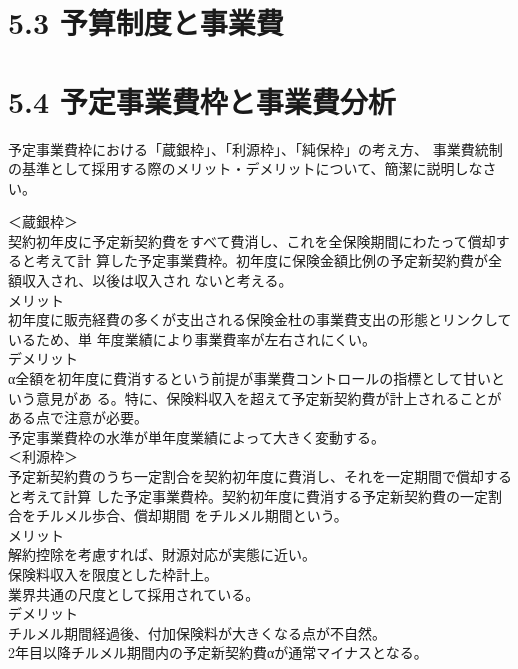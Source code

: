 \documentclass[report,gutter=10mm,fore-edge=10mm,uplatex,dvipdfmx]{jlreq}
\begin{document}
\section{5.3 予算制度と事業費}
\section{5.4 予定事業費枠と事業費分析}
\vspace{1zh}
予定事業費枠における「蔵銀枠」、「利源枠」、「純保枠」の考え方、
事業費統制の基準として採用する際のメリット・デメリットについて、簡潔に説明しなさい。

\answer{}
\noindent ＜蔵銀枠＞\\
契約初年皮に予定新契約費をすべて費消し、これを全保険期間にわたって償却すると考えて計
算した予定事業費枠。初年度に保険金額比例の予定新契約費が全額収入され、以後は収入され
ないと考える。\\
メリット \\
初年度に販売経費の多くが支出される保険金杜の事業費支出の形態とリンクしているため、単
年度業績により事業費率が左右されにくい。\\
デメリット\\
α全額を初年度に費消するという前提が事業費コントロールの指標として甘いという意見があ
る。特に、保険料収入を超えて予定新契約費が計上されることがある点で注意が必要。\\
予定事業費枠の水準が単年度業績によって大きく変動する。\\

\noindent＜利源枠＞\\
予定新契約費のうち一定割合を契約初年度に費消し、それを一定期間で償却すると考えて計算
した予定事業費枠。契約初年度に費消する予定新契約費の一定割合をチルメル歩合、償却期間
をチルメル期間という。\\
メリット \\
解約控除を考慮すれば、財源対応が実態に近い。\\
保険料収入を限度とした枠計上。\\
業界共通の尺度として採用されている。\\
デメリット\\
チルメル期間経過後、付加保険料が大きくなる点が不自然。\\
2年目以降チルメル期間内の予定新契約費αが通常マイナスとなる。\\
\end{document}
